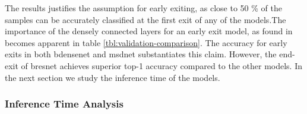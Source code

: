The results justifies the assumption for early exiting, as close to 50 \% of the samples can be accurately classified at the first exit of any of the models.The importance of the densely connected layers for an early exit model, as found in \cite{huang_multi-scale_2017} becomes apparent in table \ref{tbl:validation-comparison}. The accuracy for early exits in both \gls{bdensenet} and \gls{msdnet} substantiates this claim. However, the end-exit of \gls{bresnet} achieves superior top-1 accuracy compared to the other models. In the next section we study the inference time of the models.  

\subsubsection{Inference Time Analysis}

